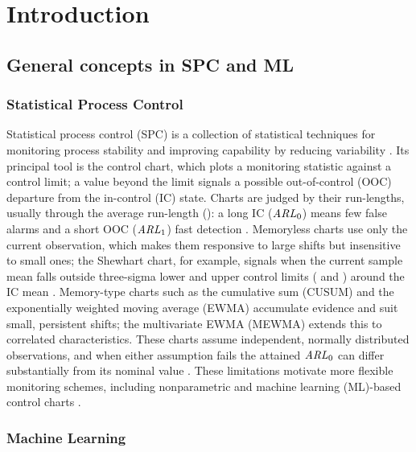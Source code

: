 \section{Introduction}

\subsection{General concepts in SPC and ML}

\subsubsection{Statistical Process Control}

Statistical process control (SPC) is a collection of statistical techniques for monitoring process
stability and improving capability by reducing variability \citep{montgomery_statistical_2012}. Its
principal tool is the control chart, which plots a monitoring statistic against a control limit;
a value beyond the limit signals a possible out-of-control (OOC) departure from the in-control (IC)
state. Charts are judged by their run-lengths, usually through the average run-length (\ARL{}): a long IC \ARL{} ($\mathit{ARL}_0$) means few false alarms and a short OOC \ARL{} ($\mathit{ARL}_1$) fast detection \citep{ahmed_statistical_2017}. Memoryless charts use only the current observation, which makes them responsive to large shifts but insensitive to small ones; the Shewhart chart, for example, signals when the current sample mean falls outside three-sigma lower and upper control limits (\LCL{} and \UCL{}) around the IC mean \citep{ahmed_statistical_2017}. Memory-type charts such as the cumulative sum (CUSUM) \citep{page_continuous_1954} and the
exponentially weighted moving average (EWMA) \citep{roberts_control_1959} accumulate evidence and
suit small, persistent shifts; the multivariate EWMA (MEWMA) \citep{lowry_multivariate_1992} extends
this to correlated characteristics. These charts assume independent, normally distributed
observations, and when either assumption fails the attained $\mathit{ARL}_0$ can differ substantially from its nominal value \citep{lowry_multivariate_1992,ahmed_statistical_2017}. These limitations motivate more flexible monitoring schemes, including nonparametric \citep{arslan_rankbased_2026} and machine learning (ML)-based control charts \citep{mukhtiar_enhanced_2025}.

\subsubsection{Machine Learning}

